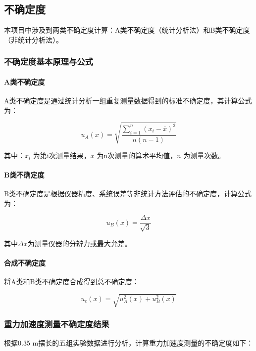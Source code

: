 \subsection{不确定度}
本项目中涉及到两类不确定度计算：A类不确定度（统计分析法）和B类不确定度（非统计分析法）。

\subsubsection{不确定度基本原理与公式}

\paragraph{A类不确定度}
A类不确定度是通过统计分析一组重复测量数据得到的标准不确定度，其计算公式为：

\begin{equation}
u_A(x) = \sqrt{\frac{\sum_{i=1}^{n}(x_i-\bar{x})^2}{n(n-1)}}
\end{equation}

其中：$x_i$ 为第i次测量结果，$\bar{x}$ 为n次测量的算术平均值，$n$ 为测量次数。

\paragraph{B类不确定度}
B类不确定度是根据仪器精度、系统误差等非统计方法评估的不确定度，计算公式为：

\begin{equation}
u_B(x) = \frac{\Delta x}{\sqrt{3}}
\end{equation}

其中$\Delta x$为测量仪器的分辨力或最大允差。

\paragraph{合成不确定度}
将A类和B类不确定度合成得到总不确定度：

\begin{equation}
u_c(x) = \sqrt{u_A^2(x) + u_B^2(x)}
\end{equation}

\subsubsection{重力加速度测量不确定度结果}

根据0.35 m摆长的五组实验数据进行分析，计算重力加速度测量的不确定度如下：

